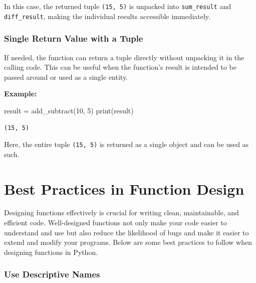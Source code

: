 \documentclass[
  letterpaper,
  DIV=11,
  numbers=noendperiod]{scrreprt}
\newenvironment{Shaded}{\begin{snugshade}}{\end{snugshade}}
\newcommand{\BuiltInTok}[1]{\textcolor[rgb]{0.00,0.23,0.31}{#1}}
\newcommand{\DecValTok}[1]{\textcolor[rgb]{0.68,0.00,0.00}{#1}}
\newcommand{\NormalTok}[1]{\textcolor[rgb]{0.00,0.23,0.31}{#1}}
\newcommand{\OperatorTok}[1]{\textcolor[rgb]{0.37,0.37,0.37}{#1}}
\begin{document}
In this case, the returned tuple \texttt{(15,\ 5)} is unpacked into
\texttt{sum\_result} and \texttt{diff\_result}, making the individual
results accessible immediately.

\hypertarget{single-return-value-with-a-tuple}{%
\subsubsection{Single Return Value with a
Tuple}\label{single-return-value-with-a-tuple}}

If needed, the function can return a tuple directly without unpacking it
in the calling code. This can be useful when the function's result is
intended to be passed around or used as a single entity.

\textbf{Example:}

\begin{Shaded}
\begin{Highlighting}[]
\NormalTok{result }\OperatorTok{=}\NormalTok{ add\_subtract(}\DecValTok{10}\NormalTok{, }\DecValTok{5}\NormalTok{)}
\BuiltInTok{print}\NormalTok{(result) }
\end{Highlighting}
\end{Shaded}

\begin{verbatim}
(15, 5)
\end{verbatim}

Here, the entire tuple \texttt{(15,\ 5)} is returned as a single object
and can be used as such.

\hypertarget{best-practices-in-function-design}{%
\section{Best Practices in Function
Design}\label{best-practices-in-function-design}}

Designing functions effectively is crucial for writing clean,
maintainable, and efficient code. Well-designed functions not only make
your code easier to understand and use but also reduce the likelihood of
bugs and make it easier to extend and modify your programs. Below are
some best practices to follow when designing functions in Python.

\hypertarget{use-descriptive-names}{%
\subsubsection{Use Descriptive Names}\label{use-descriptive-names}}
\end{document}
